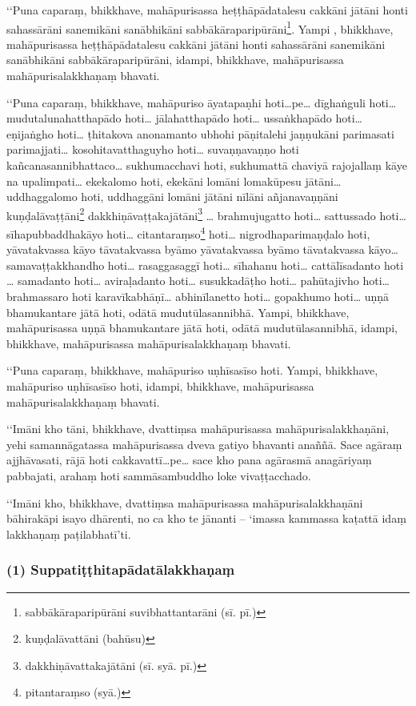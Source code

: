 ‘‘Puna caparaṃ, bhikkhave, mahāpurisassa heṭṭhāpādatalesu cakkāni jātāni honti sahassārāni sanemikāni sanābhikāni sabbākāraparipūrāni\footnote{sabbākāraparipūrāni suvibhattantarāni (sī. pī.)}. Yampi , bhikkhave, mahāpurisassa heṭṭhāpādatalesu cakkāni jātāni honti sahassārāni sanemikāni sanābhikāni sabbākāraparipūrāni, idampi, bhikkhave, mahāpurisassa mahāpurisalakkhaṇaṃ bhavati.

‘‘Puna caparaṃ, bhikkhave, mahāpuriso āyatapaṇhi hoti…pe… dīghaṅguli hoti… mudutalunahatthapādo hoti… jālahatthapādo hoti… ussaṅkhapādo hoti… eṇijaṅgho hoti… ṭhitakova anonamanto ubhohi pāṇitalehi jaṇṇukāni parimasati parimajjati… kosohitavatthaguyho hoti… suvaṇṇavaṇṇo hoti kañcanasannibhattaco… sukhumacchavi hoti, sukhumattā chaviyā rajojallaṃ kāye na upalimpati… ekekalomo hoti, ekekāni lomāni lomakūpesu jātāni… uddhaggalomo hoti, uddhaggāni lomāni jātāni nīlāni añjanavaṇṇāni kuṇḍalāvaṭṭāni\footnote{kuṇḍalāvattāni (bahūsu)} dakkhiṇāvaṭṭakajātāni\footnote{dakkhiṇāvattakajātāni (sī. syā. pī.)} … brahmujugatto hoti… sattussado hoti… sīhapubbaddhakāyo hoti… citantaraṃso\footnote{pitantaraṃso (syā.)} hoti… nigrodhaparimaṇḍalo hoti, yāvatakvassa kāyo tāvatakvassa byāmo yāvatakvassa byāmo tāvatakvassa kāyo… samavaṭṭakkhandho hoti… rasaggasaggī hoti… sīhahanu hoti… cattālīsadanto hoti … samadanto hoti… aviraḷadanto hoti… susukkadāṭho hoti… pahūtajivho hoti… brahmassaro hoti karavīkabhāṇī… abhinīlanetto hoti… gopakhumo hoti… uṇṇā bhamukantare jātā hoti, odātā mudutūlasannibhā. Yampi, bhikkhave, mahāpurisassa uṇṇā bhamukantare jātā hoti, odātā mudutūlasannibhā, idampi, bhikkhave, mahāpurisassa mahāpurisalakkhaṇaṃ bhavati.

‘‘Puna caparaṃ, bhikkhave, mahāpuriso uṇhīsasīso hoti. Yampi, bhikkhave, mahāpuriso uṇhīsasīso hoti, idampi, bhikkhave, mahāpurisassa mahāpurisalakkhaṇaṃ bhavati.

‘‘Imāni kho tāni, bhikkhave, dvattiṃsa mahāpurisassa mahāpurisalakkhaṇāni, yehi samannāgatassa mahāpurisassa dveva gatiyo bhavanti anaññā. Sace agāraṃ ajjhāvasati, rājā hoti cakkavattī…pe… sace kho pana agārasmā anagāriyaṃ pabbajati, arahaṃ hoti sammāsambuddho loke vivaṭṭacchado.

‘‘Imāni kho, bhikkhave, dvattiṃsa mahāpurisassa mahāpurisalakkhaṇāni bāhirakāpi isayo dhārenti, no ca kho te jānanti – ‘imassa kammassa kaṭattā idaṃ lakkhaṇaṃ paṭilabhatī’ti.

\subsubsection{(1) Suppatiṭṭhitapādatālakkhaṇaṃ}

